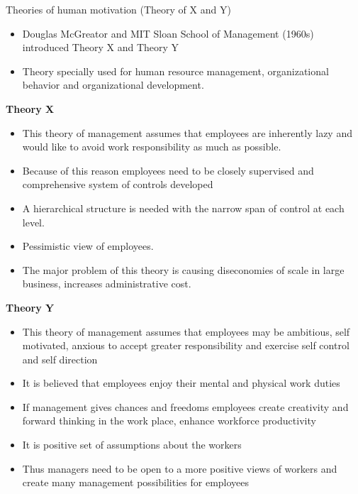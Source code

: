 \documentclass[12pt,ignorenonframetext,aspectratio=169]{beamer}
\providecommand{\tightlist}{%
  \setlength{\itemsep}{0pt}\setlength{\parskip}{0pt}}
\begin{document}
\begin{frame}{Theories of human motivation (Theory of X and Y)}
\protect\hypertarget{theories-of-human-motivation-theory-of-x-and-y}{}
\begin{itemize}
\tightlist
\item
  Douglas McGreator and MIT Sloan School of Management (1960s)
  introduced Theory X and Theory Y
\item
  Theory specially used for human resource management, organizational
  behavior and organizational development.
\end{itemize}

\textbf{Theory X}

\begin{itemize}
\tightlist
\item
  This theory of management assumes that employees are inherently lazy
  and would like to avoid work responsibility as much as possible.
\item
  Because of this reason employees need to be closely supervised and
  comprehensive system of controls developed
\item
  A hierarchical structure is needed with the narrow span of control at
  each level.
\item
  Pessimistic view of employees.
\item
  The major problem of this theory is causing diseconomies of scale in
  large business, increases administrative cost.
\end{itemize}
\end{frame}

\begin{frame}{}
\protect\hypertarget{section}{}
\textbf{Theory Y}

\begin{itemize}
\tightlist
\item
  This theory of management assumes that employees may be ambitious,
  self motivated, anxious to accept greater responsibility and exercise
  self control and self direction
\item
  It is believed that employees enjoy their mental and physical work
  duties
\item
  If management gives chances and freedoms employees create creativity
  and forward thinking in the work place, enhance workforce productivity
\item
  It is positive set of assumptions about the workers
\item
  Thus managers need to be open to a more positive views of workers and
  create many management possibilities for employees
\end{itemize}
\end{frame}
\end{document}
